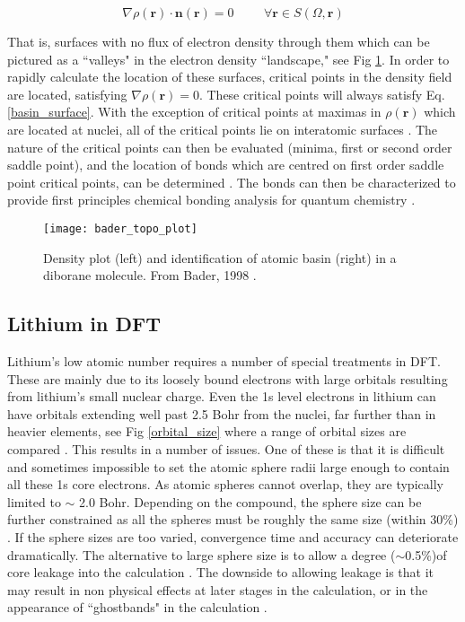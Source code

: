 \begin{equation}
\nabla \rho(\textbf{r}) \cdot \textbf{n}(\textbf{r}) = 0   \hspace{1cm} \forall\textbf{r} \in S(\Omega,\textbf{r})
\label{basin_surface}
\end{equation}

That is, surfaces with no flux of electron density through them which can be pictured as a ``valleys" in the electron density ``landscape," see Fig \ref{topo_plot}. In order to  rapidly calculate the location of these surfaces, critical points in the density field are located, satisfying $\nabla \rho(\textbf{r})=0$.  These critical points will always satisfy Eq. \ref{basin_surface}.  With the exception of critical points at maximas in $\rho(\textbf{r})$ which are located at nuclei, all of the critical points lie on interatomic surfaces \cite{critic2}. The nature of the critical points can then be evaluated (minima, first or second order saddle point), and the location of bonds which are centred on first order saddle point critical points, can be determined \cite{critic2}.  The bonds can then be characterized to provide first principles chemical bonding analysis for quantum chemistry \cite{fugel_variety_2018}.  

\begin{figure}
	\centering
	\texttt{[image: bader\_topo\_plot]}
	\caption{Density plot (left) and identification of atomic basin (right) in a diborane molecule. From Bader, 1998 \cite{bader}.}
	\label{topo_plot}
\end{figure}


\subsection{Lithium in DFT}
Lithium's low atomic number requires a number of special treatments  in DFT.  These are mainly due to its loosely bound electrons with large orbitals resulting from lithium's small nuclear charge.  Even the 1s level electrons in lithium can have orbitals extending well past 2.5 Bohr from the nuclei, far further than in heavier elements, see Fig \ref{orbital_size} where a range of orbital sizes are compared \cite{mauchamp_ab_2006}.  This results in a number of issues. One of these is that it is difficult and sometimes impossible to set the atomic sphere radii large enough to contain all these 1s core electrons.  As atomic spheres cannot overlap, they are typically limited to $\sim$ 2.0 Bohr. Depending on the compound, the sphere size can be further constrained as all the spheres must be roughly the same size (within 30\%) \cite{wien2k}.  If the sphere sizes are too varied, convergence time and accuracy can deteriorate dramatically.  The alternative to large sphere size is to allow a degree ($\sim$0.5\%)of core leakage into the calculation \cite{wien2k}.  The downside to allowing leakage is that it may result in non physical effects at later stages in the calculation, or in the appearance of ``ghostbands" in the calculation \cite{wien2k}.

